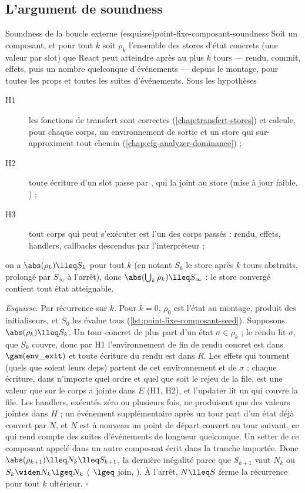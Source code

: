 \subsection{L'argument de soundness}

\begin{theoreme}{Soundness de la boucle externe (esquisse)}{point-fixe-composant-soundness}
Soit un composant, et pour tout $k$ soit $\rho_k$ l'ensemble des stores
d'état concrets (une valeur par slot) que React peut atteindre après au plus
$k$ tours --- rendu, commit, effets, puis un nombre quelconque d'événements
--- depuis le montage, pour toutes les props et toutes les suites
d'événements. Sous les hypothèses
\begin{description}
  \item[H1] les fonctions de transfert sont correctes (\cref{chap:transfert-stores}) et  calcule, pour chaque corps, un environnement de sortie et un store qui sur-approximent tout chemin (\cref{chap:cfg-analyzer-dominance}) ;
  \item[H2] toute écriture d'un slot passe par , qui la joint au store (mise à jour faible, ) ;
  \item[H3] tout corps qui peut s'exécuter est l'un des corps passés : rendu, effets, handlers, callbacks descendus par l'interpréteur ;
\end{description}
on a $\abs(\rho_k) \lleq S_k$ pour tout $k$ (en notant $S_k$ le store
après $k$ tours abstraits, prolongé par $S_{\infty}$ à l'arrêt), donc
$\abs(\bigcup_k \rho_k) \lleq S_{\infty}$ : le store convergé contient tout
état atteignable.

\emph{Esquisse.} Par récurrence sur $k$. Pour $k = 0$, $\rho_0$ est l'état
au montage, produit des initialiseurs, et $S_0$ les évalue tous
(\cref{lst:point-fixe-composant-seed}). Supposons $\abs(\rho_k) \lleq S_k$.
Un tour concret de plus part d'un état $\sigma \in \rho_k$ ; le rendu lit
$\sigma$, que $S_k$ couvre, donc par H1 l'environnement de fin de rendu
concret est dans $\gam(\mathtt{env\_exit})$ et toute écriture du rendu est
dans $R$. Les effets qui tournent (quels que soient leurs deps) partent de
cet environnement et de $\sigma$ ; chaque écriture, dans n'importe quel
ordre et quel que soit le rejeu de la file, est une valeur que
 sur le corps a jointe dans $E$ (H1, H2), et l'updater
lit un  qui couvre la file. Les handlers, exécutés
zéro ou plusieurs fois, ne produisent que des valeurs jointes dans $H$ ;
un événement supplémentaire après un tour part d'un état déjà couvert par
$N$, et $N$ est à nouveau un point de départ couvert au tour suivant, ce
qui rend compte des suites d'événements de longueur quelconque. Un setter de
ce composant appelé dans un autre composant écrit dans la tranche importée.
Donc $\abs(\rho_{k+1}) \lleq N_k \lleq S_{k+1}$, la dernière inégalité
parce que $S_{k+1}$ vaut $N_k$ ou $S_k \widen N_k \lgeq N_k$
( $\lgeq$ join, ).
À l'arrêt, $N \lleq S$ ferme la récurrence pour tout $k$ ultérieur. $\square$
\end{theoreme}

